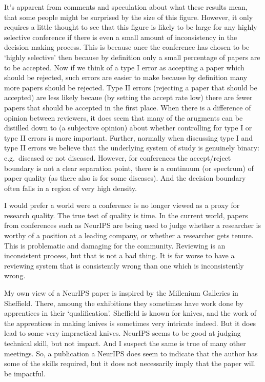 It's apparent from comments and speculation about what these results
mean, that some people might be surprised by the size of this figure.
However, it only requires a little thought to see that this figure is
likely to be large for any highly selective conference if there is even
a small amount of inconsistency in the decision making process. This is
because once the conference has chosen to be `highly selective' then
because by definition only a small percentage of papers are to be
accepted. Now if we think of a type I error as accepting a paper which
should be rejected, such errors are easier to make because by definition
many more papers should be rejected. Type II errors (rejecting a paper
that should be accepted) are less likely becaue (by setting the accept
rate low) there are fewer papers that should be accepted in the first
place. When there is a difference of opinion between reviewers, it does
seem that many of the arugments can be distilled down to (a subjective
opinion) about whether controlling for type I or type II errors is more
important. Further, normally when discussing type I and type II errors
we believe that the underlying system of study is genuinely binary:
e.g.~diseased or not diseased. However, for conferences the
accept/reject boundary is not a clear separation point, there is a
continuum (or spectrum) of paper quality (as there also is for some
diseases). And the decision boundary often falls in a region of very
high density.

I would prefer a world were a conference is no longer viewed as a proxy
for research quality. The true test of quality is time. In the current
world, papers from conferences such as NeurIPS are being used to judge
whether a researcher is worthy of a position at a leading company, or
whether a researcher gets tenure. This is problematic and damaging for
the community. Reviewing is an inconsistent process, but that is not a
bad thing. It is far worse to have a reviewing system that is
consistently wrong than one which is inconsistently wrong.

My own view of a NeurIPS paper is inspired by the Millenium Galleries in
Sheffield. There, amoung the exhibitions they sometimes have work done
by apprentices in their `qualification'. Sheffield is known for knives,
and the work of the apprentices in making knives is sometimes very
intricate indeed. But it does lead to some very impractical knives.
NeurIPS seems to be good at judging technical skill, but not impact. And
I suspect the same is true of many other meetings. So, a publication a
NeurIPS does seem to indicate that the author has some of the skills
required, but it does not necessarily imply that the paper will be
impactful.

